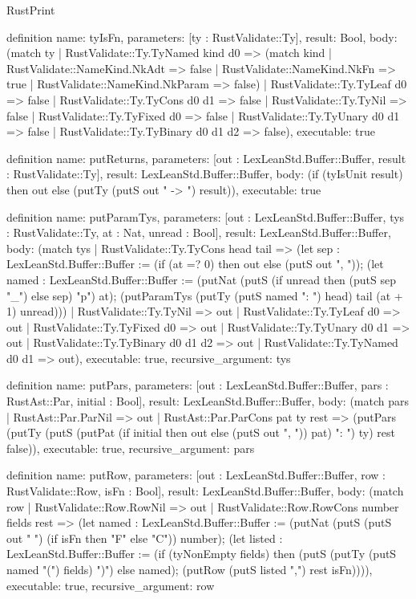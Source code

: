\begin{lexlean}{RustPrint}
\begin{semanticmodule}
definition{
  name: tyIsFn,
  parameters: [ty : RustValidate::Ty],
  result: Bool,
  body: (match ty
    | RustValidate::Ty.TyNamed kind d0 => (match kind
      | RustValidate::NameKind.NkAdt => false
      | RustValidate::NameKind.NkFn => true
      | RustValidate::NameKind.NkParam => false)
    | RustValidate::Ty.TyLeaf d0 => false
    | RustValidate::Ty.TyCons d0 d1 => false
    | RustValidate::Ty.TyNil => false
    | RustValidate::Ty.TyFixed d0 => false
    | RustValidate::Ty.TyUnary d0 d1 => false
    | RustValidate::Ty.TyBinary d0 d1 d2 => false),
  executable: true
}

definition{
  name: putReturns,
  parameters: [out : LexLeanStd.Buffer::Buffer, result : RustValidate::Ty],
  result: LexLeanStd.Buffer::Buffer,
  body: (if (tyIsUnit result) then out else (putTy (putS out " -> ") result)),
  executable: true
}

definition{
  name: putParamTys,
  parameters: [out : LexLeanStd.Buffer::Buffer, tys : RustValidate::Ty, at : Nat, unread : Bool],
  result: LexLeanStd.Buffer::Buffer,
  body: (match tys
    | RustValidate::Ty.TyCons head tail => (let sep : LexLeanStd.Buffer::Buffer := (if (at =? 0) then out else (putS out ", ")); (let named : LexLeanStd.Buffer::Buffer := (putNat (putS (if unread then (putS sep "_") else sep) "p") at); (putParamTys (putTy (putS named ": ") head) tail (at + 1) unread)))
    | RustValidate::Ty.TyNil => out
    | RustValidate::Ty.TyLeaf d0 => out
    | RustValidate::Ty.TyFixed d0 => out
    | RustValidate::Ty.TyUnary d0 d1 => out
    | RustValidate::Ty.TyBinary d0 d1 d2 => out
    | RustValidate::Ty.TyNamed d0 d1 => out),
  executable: true,
  recursive_argument: tys
}

definition{
  name: putPars,
  parameters: [out : LexLeanStd.Buffer::Buffer, pars : RustAst::Par, initial : Bool],
  result: LexLeanStd.Buffer::Buffer,
  body: (match pars
    | RustAst::Par.ParNil => out
    | RustAst::Par.ParCons pat ty rest => (putPars (putTy (putS (putPat (if initial then out else (putS out ", ")) pat) ": ") ty) rest false)),
  executable: true,
  recursive_argument: pars
}

definition{
  name: putRow,
  parameters: [out : LexLeanStd.Buffer::Buffer, row : RustValidate::Row, isFn : Bool],
  result: LexLeanStd.Buffer::Buffer,
  body: (match row
    | RustValidate::Row.RowNil => out
    | RustValidate::Row.RowCons number fields rest => (let named : LexLeanStd.Buffer::Buffer := (putNat (putS (putS out "    ") (if isFn then "F" else "C")) number); (let listed : LexLeanStd.Buffer::Buffer := (if (tyNonEmpty fields) then (putS (putTy (putS named "(") fields) ")") else named); (putRow (putS listed ",\n") rest isFn)))),
  executable: true,
  recursive_argument: row
}


\end{semanticmodule}
\end{lexlean}
